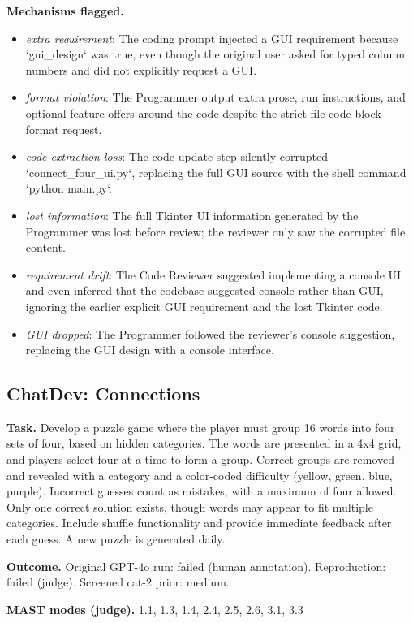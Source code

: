 \textbf{Mechanisms flagged.}
\begin{itemize}
  \item \emph{extra requirement}: The coding prompt injected a GUI requirement because `gui\_design` was true, even though the original user asked for typed column numbers and did not explicitly request a GUI.
  \item \emph{format violation}: The Programmer output extra prose, run instructions, and optional feature offers around the code despite the strict file-code-block format request.
  \item \emph{code extraction loss}: The code update step silently corrupted `connect\_four\_ui.py`, replacing the full GUI source with the shell command `python main.py`.
  \item \emph{lost information}: The full Tkinter UI information generated by the Programmer was lost before review; the reviewer only saw the corrupted file content.
  \item \emph{requirement drift}: The Code Reviewer suggested implementing a console UI and even inferred that the codebase suggested console rather than GUI, ignoring the earlier explicit GUI requirement and the lost Tkinter code.
  \item \emph{GUI dropped}: The Programmer followed the reviewer's console suggestion, replacing the GUI design with a console interface.
\end{itemize}

\subsection*{ChatDev: Connections}
\textbf{Task.} Develop a puzzle game where the player must group 16 words into four sets of four, based on hidden categories. The words are presented in a 4x4 grid, and players select four at a time to form a group. Correct groups are removed and revealed with a category and a color-coded difficulty (yellow, green, blue, purple). Incorrect guesses count as mistakes, with a maximum of four allowed. Only one correct solution exists, though words may appear to fit multiple categories. Include shuffle functionality and provide immediate feedback after each guess. A new puzzle is generated daily.

\textbf{Outcome.} Original GPT-4o run: failed (human annotation). Reproduction: failed (judge). Screened cat-2 prior: medium.

\textbf{MAST modes (judge).} 1.1, 1.3, 1.4, 2.4, 2.5, 2.6, 3.1, 3.3

